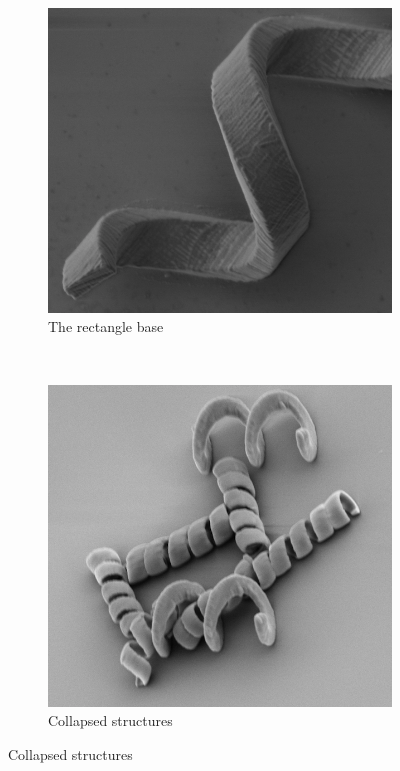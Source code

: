 \documentclass[12pt,a4paper,titlepage]{report}
\begin{document}
\begin{figure}
\begin{subfigure}[b]{0.50\textwidth}
                \includegraphics[width=\textwidth]{closeRectangle}
                \caption{The rectangle base}
                \label{closeRectangle}
        \end{subfigure}~
       \begin{subfigure}[b]{0.475\textwidth}
                \includegraphics[width=\textwidth]{collaps}
                \caption{Collapsed structures}
                \label{collaps}
        \end{subfigure}


\end{figure}
\end{document}
